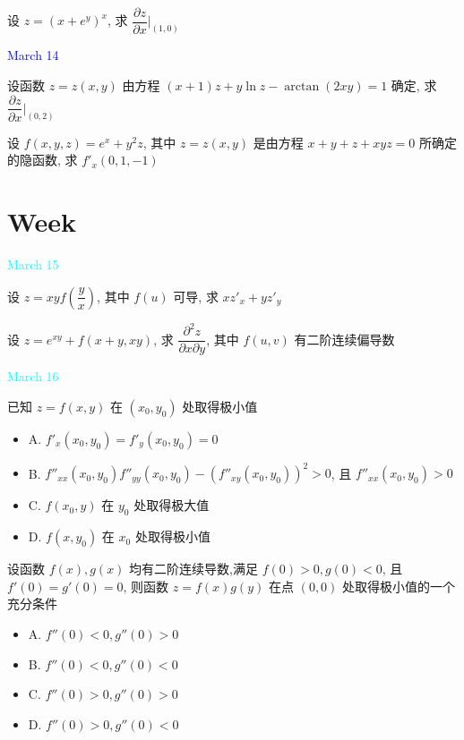 \begin{example}[][Exam: 29.2.12]
	设 $z=(x+e^{y})^{x}$, 求 $\dfrac{\partial z}{\partial x}\big|_{(1,0)}$
\end{example}

\textcolor{blue}{March 14}

\begin{example}[][Exam: 29.2.13]
	设函数 $z=z(x,y)$ 由方程 $(x+1)z+y\ln z-\arctan(2xy)=1$ 确定, 
	求$\dfrac{\partial z}{\partial x}\big|_{(0,2)}$
\end{example}

\begin{example}[][Exam: 29.2.14]
	设 $f(x,y,z)=e^{x}+y^{2}z$, 其中 $z=z(x,y)$ 是由方程 $x+y+z+xyz=0$ 所确定的隐函数, 求 $f'_{x}(0,1,-1)$
\end{example}
\section{Week }
\textcolor{cyan}{March 15}

\begin{example}[][Exam: 29.3.1]
	设 $z=xyf(\dfrac{y}{x})$, 其中 $f(u)$ 可导, 求 $xz'_{x}+yz'_{y}$
\end{example}

\begin{example}[][Exam: 29.3.2]
	设 $z=e^{xy}+f(x+y,xy)$, 求 $\dfrac{\partial^{2} z}{\partial x\partial y}$, 其中 $f(u,v)$ 有二阶连续偏导数
\end{example}

\textcolor{cyan}{March 16}

\begin{example}[][Exam: 29.3.3]
	已知 $z=f(x,y)$ 在 $(x_{0},y_{0})$ 处取得极小值
\begin{itemize}
	\item A. $f'_{x}(x_{0},y_{0})=f'_{y}(x_{0},y_{0})=0$
	\item B. $f''_{xx}(x_{0},y_{0})f''_{yy}(x_{0},y_{0})-(f''_{xy}(x_{0},y_{0}))^{2}>0$, 且 $f''_{xx}(x_{0},y_{0})>0$
	\item C. $f(x_{0},y)$ 在 $y_{0}$ 处取得极大值
	\item D. $f(x,y_{0})$ 在 $x_{0}$ 处取得极小值
\end{itemize}
\end{example}

\begin{example}[][Exam: 29.3.4]
	设函数 $f(x),g(x)$ 均有二阶连续导数,满足 $f(0)>0,g(0)<0$, 且 $f'(0)=g'(0)=0$, 
	则函数 $z=f(x)g(y)$ 在点 $(0,0)$ 处取得极小值的一个充分条件
\begin{itemize}
	\item A. $f''(0)<0,g''(0)>0$
	\item B. $f''(0)<0,g''(0)<0$
	\item C. $f''(0)>0,g''(0)>0$
	\item D. $f''(0)>0,g''(0)<0$
\end{itemize}
\end{example}

